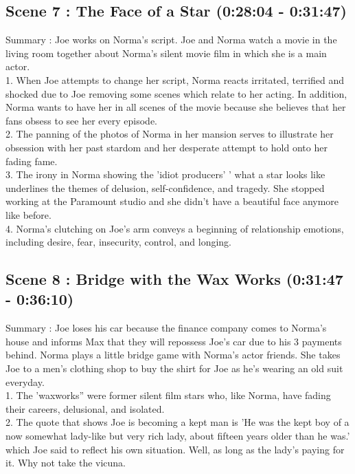 \documentclass[a4paper]{article}
\begin{document}
\subsection{Scene 7 : The Face of a Star (0:28:04 - 0:31:47)}
Summary : Joe works on Norma’s script. Joe and Norma watch a movie in the living room
together about Norma’s silent movie film in which she is a main actor.\\
1. When Joe attempts to change her script, Norma reacts irritated, terrified and shocked
due to Joe removing some scenes which relate to her acting. In addition, Norma
wants to have her in all scenes of the movie because she believes that her fans
obsess to see her every episode.\\
2. The panning of the photos of Norma in her mansion serves to illustrate her obsession
with her past stardom and her desperate attempt to hold onto her fading fame.\\
3. The irony in Norma showing the 'idiot producers' ' what a star looks like underlines
the themes of delusion, self-confidence, and tragedy. She stopped working at the
Paramount studio and she didn’t have a beautiful face anymore like before.\\
4. Norma's clutching on Joe's arm conveys a beginning of relationship emotions,
including desire, fear, insecurity, control, and longing.\\

\subsection{Scene 8 : Bridge with the Wax Works (0:31:47 - 0:36:10)}
Summary : Joe loses his car because the finance company comes to Norma’s house and
informs Max that they will repossess Joe’s car due to his 3 payments behind. Norma plays a
little bridge game with Norma’s actor friends. She takes Joe to a men's clothing shop to buy
the shirt for Joe as he’s wearing an old suit everyday.\\
1. The 'waxworks” were former silent film stars who, like Norma, have fading their
careers, delusional, and isolated.\\
2. The quote that shows Joe is becoming a kept man is 'He was the kept boy of a now
somewhat lady-like but very rich lady, about fifteen years older than he was.' which
Joe said to reflect his own situation. Well, as long as the lady's paying for it. Why not
take the vicuna.\\
\end{document}

